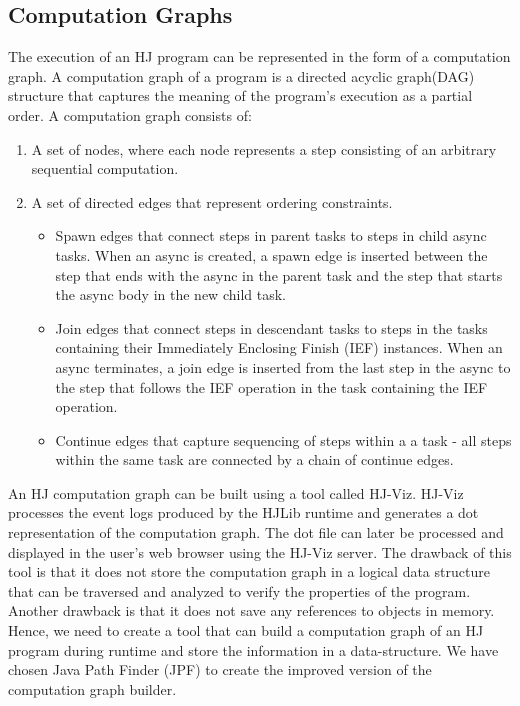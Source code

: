 \subsection{Computation Graphs}
The execution of an HJ program can be represented in the form of a computation graph. A computation graph of a program is a directed acyclic graph(DAG) structure that captures the meaning of the program's execution as a partial order. A computation graph consists of:
\begin{enumerate}
\item A set of nodes, where each node represents a step consisting of an arbitrary sequential computation. 
\item A set of directed edges that represent ordering constraints. 
\begin{itemize}
 \item Spawn edges that connect steps in parent tasks to steps in child async tasks. When an async is created, a spawn edge is inserted between the step that ends with the async in the parent task and the step that starts the async body in the new child task.
\item Join edges that connect steps in descendant tasks to steps in the tasks containing their Immediately Enclosing Finish (IEF) instances. When an async terminates, a join edge is inserted from the last step in the async to the step that follows the IEF operation in the task containing the IEF operation.
\item Continue edges that capture sequencing of steps within a a task - all steps within the same task are connected by a chain of continue edges.
 \end{itemize} 
\end{enumerate}
An HJ computation graph can be built using a tool called HJ-Viz. HJ-Viz processes the event logs produced by the HJLib runtime and generates a dot representation of the computation graph. The dot file can later be processed and displayed in the user’s web browser using the HJ-Viz server. The drawback of this tool is that it does not store the computation graph in a logical data structure that can be traversed and analyzed to verify the properties of the program. Another drawback is that it does not save any references to objects in memory. Hence, we need to create a tool that can build a computation graph of an HJ program during runtime and store the information in a data-structure. We have chosen Java Path Finder (JPF) to create the improved version of the computation graph builder. 

